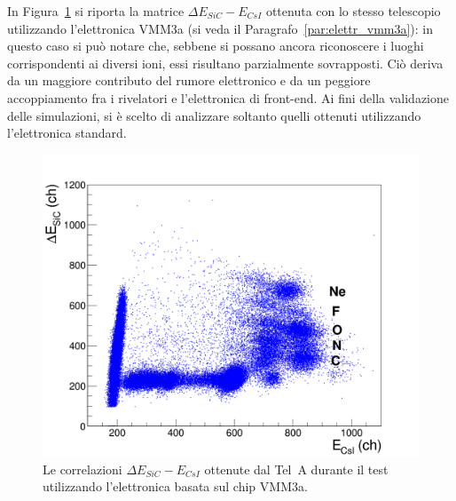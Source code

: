 In Figura~\ref{fig:sic_csi_vmm3a} si riporta la  matrice $\Delta E_{SiC} - E_{CsI}$ ottenuta con lo stesso telescopio utilizzando l'elettronica VMM3a (si veda il Paragrafo~\ref{par:elettr_vmm3a}): in questo caso si può notare che, sebbene si possano ancora riconoscere i luoghi corrispondenti ai diversi ioni, essi risultano parzialmente sovrapposti.
Ciò deriva da un maggiore contributo del rumore elettronico e da un peggiore accoppiamento fra i rivelatori e l'elettronica di front-end.
Ai fini della validazione delle simulazioni, si è scelto di analizzare soltanto quelli ottenuti utilizzando l'elettronica standard.

\begin{figure} [!p]
	\centering
	\includegraphics[width=\textwidth, keepaspectratio]{Grafici_Tesi/Test/matrice_sic_csi_vmm3a.png}
	\caption{Le correlazioni $\Delta E_{SiC} - E_{CsI}$ ottenute dal Tel~A durante il test utilizzando l'elettronica basata sul chip VMM3a.} \label{fig:sic_csi_vmm3a}
\end{figure}

